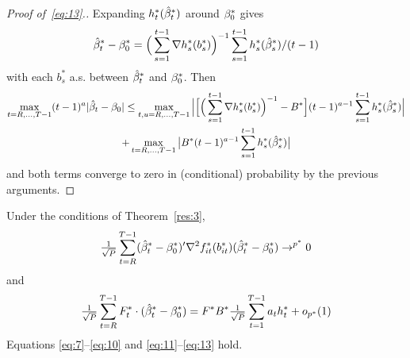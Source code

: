 \documentclass[12pt,fleqn]{article}
\begin{document}
\begin{proof}[Proof of~\eqref{eq:13}.]
Expanding $h_t^*(\hat \beta_t^*)$ around $\beta_0^*$ gives
\begin{equation*}
\hat \beta_t^* - \beta_0^* = \Big(\sum_{s=1}^{t-1} \nabla h_s^*(b_s^*) \Big)^{-1} \sum_{s=1}^{t-1} h_s^*(\hat \beta_s^*) / (t-1)
\end{equation*}
with each $b_s^*$ a.s. between $\hat \beta_t^*$ and $\beta_0^*$. Then
\begin{multline}
  \max_{t=R,\dots,T-1} (t-1)^a | \hat{\beta}_t - \beta_0 |
  \leq
  \max_{t,u=R,\dots,T-1} \Big|\Big[ \Big(\sum_{s=1}^{t-1} \nabla h_s^*(b_s^*) \Big)^{-1} - B^* \Big]
  (t-1)^{a-1} \sum_{s=1}^{t-1} h_s^*(\hat \beta_s^*) \Big|\\
  + \max_{t=R,\dots,T-1} \big| B^*   (t-1)^{a-1} \sum_{s=1}^{t-1} h_s^*(\hat \beta_s^*) \big|
\end{multline}
and both terms converge to zero in (conditional) probability by the
previous arguments.
\end{proof}

\begin{lema}\label{res:a4}
  Under the conditions of Theorem~\ref{res:3},
  \begin{equation}\label{eq:16}
    \tfrac{1}{\sqrt{P}} \sum_{t=R}^{T-1} (\hat \beta_t^* - \beta_0^*)' \nabla^2 f_{it}^*(b_{it}^*) (\hat \beta_t^* - \beta_0^*) \to^{p^*} 0
  \end{equation}
  and
  \begin{equation}\label{eq:17}
    \tfrac{1}{\sqrt{P}} \sum_{t=R}^{T-1} F_t^* \cdot (\hat \beta_t^* - \beta_0^*)
    = F^* B^* \tfrac{1}{\sqrt{P}} \sum_{t=1}^{T-1} a_t h_t^* + o_{p^*}(1)
  \end{equation}
Equations
  \eqref{eq:7}--\eqref{eq:10} and \eqref{eq:11}--\eqref{eq:13} hold.
\end{lema}
\end{document}
